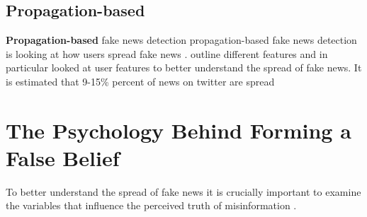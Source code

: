 \documentclass[
10pt, %
a4paper, %
oneside, %
headinclude,footinclude, %
] {book}%
\begin{document}






\subsection{Propagation-based}
\label{subsec:propagation-based}

\textbf{Propagation-based} fake news detection propagation-based fake news detection is looking at how users spread fake news \citep{zhou2020survey}. \cite{shu2017datamining} outline different features and in particular looked at user features to better understand the spread of fake news. It is estimated that 9-15\% percent of news on twitter are spread \citep{varol2017bots, lazer2018science}




\section{The Psychology Behind Forming a False Belief}
\label{sec:psychological_drivers}

To better understand the spread of fake news it is crucially important to examine the variables that influence the perceived truth of misinformation \citep{nadarevic2020perceived}.


\end{document}
